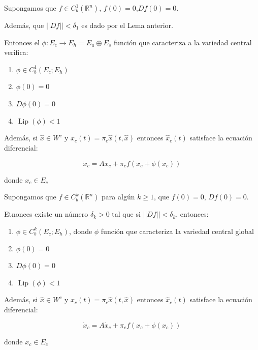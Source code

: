 \begin{lem}[Suavidad de Variedad Central Global para \text{$k = 1$}]
	Supongamos que $f \in C^1_b(\mathbb{R}^n)$, $f(0) = 0$,$Df(0) = 0$. 
	
	Además, que $||Df||< \delta_1$ es dado por el Lema anterior.
	
	Entonces el $\phi:E_c \to E_h = E_u \oplus E_s$ función que caracteriza a la variedad central verifica:
	
	\begin{enumerate}
		\item $\phi \in C^1_b(E_c;E_h)$
		\item $\phi(0) = 0$
		\item $D\phi (0) = 0$
		\item $\operatorname{Lip}(\phi) < 1$
	\end{enumerate}
	
	Además, si $\hat{x} \in W^c$ y $\widehat{x}_c(t) = \pi_c \widehat{x}(t,\hat{x})$ entonces $\widehat{x}_c(t)$ satisface la ecuación diferencial:
	
	\begin{equation*}
		\dot{x}_c = A\dot{x}_c + \pi_c f(x_c + \phi(x_c))
	\end{equation*}
	
	donde $x_c \in E_c$
\end{lem}

\begin{thm}
	Supongamos que $f \in C^k_b(\mathbb{R}^n)$ para algún $k\geq 1$, que $f(0) = 0$, $Df(0) = 0$.
	
	Etnonces existe un número $\delta_k >0$ tal que si $||Df||< \delta_k$, entonces:
	
	\begin{enumerate}
		\item $\phi \in C^k_b(E_c;E_h)$, donde $\phi$ función que caracteriza la variedad central global
		\item $\phi(0) = 0$
		\item $D\phi (0) = 0$
		\item $\operatorname{Lip}(\phi) < 1$
	\end{enumerate}
	
	Además, si $\hat{x} \in W^c$ y $\widehat{x}_c(t) = \pi_c \widehat{x}(t,\hat{x})$ entonces $\widehat{x}_c(t)$ satisface la ecuación diferencial:
	
	\begin{equation*}
		\dot{x}_c = A\dot{x}_c + \pi_c f(x_c + \phi(x_c))
	\end{equation*}
	
	donde $x_c \in E_c$
\end{thm}


